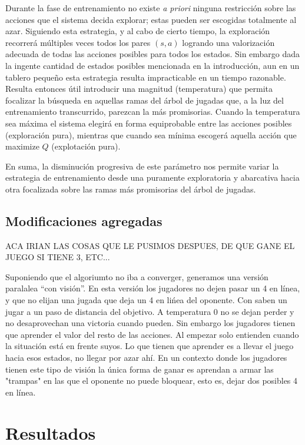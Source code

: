 \documentclass[11pt, spanish]{article}
\begin{document}
\par Durante la fase de entrenamiento no existe \emph{a priori} ninguna 
restricción sobre las acciones que el sistema decida explorar; estas pueden ser 
escogidas totalmente al azar. Siguiendo esta estrategia, y al cabo de 
cierto tiempo, la exploración recorrerá múltiples veces todos los pares 
$(s,a)$ logrando una valorización adecuada de todas las acciones posibles para 
todos los estados. Sin embargo dada la ingente cantidad de estados posibles 
mencionada en la introducción, aun en un tablero pequeño esta estrategia 
resulta impracticable en un tiempo razonable. Resulta entonces útil introducir 
una magnitud (temperatura) que permita focalizar la búsqueda en aquellas ramas 
del árbol de jugadas que, a la luz del entrenamiento transcurrido, parezcan la 
más promisorias. Cuando la temperatura sea máxima el sistema elegirá en forma 
equiprobable entre las acciones posibles (exploración pura), mientras que 
cuando sea mínima escogerá aquella acción que maximize $Q$ (explotación pura).
\par En suma, la disminución progresiva de este parámetro nos permite variar la 
estrategia de entrenamiento desde una puramente exploratoria y abarcativa hacia 
otra focalizada sobre las ramas más promisorias del árbol de jugadas.

\subsection{Modificaciones agregadas}
ACA IRIAN LAS COSAS QUE LE PUSIMOS DESPUES, DE QUE GANE EL JUEGO SI TIENE 3, ETC...

Suponiendo que el algoriumto no iba a converger, generamos una versi\'on paralalea ``con visi\'on''. En esta versi\'on los jugadores no dejen pasar un 4 en l\'inea, y que no elijan una jugada que deja un 4 en li\'nea del oponente. Con saben un jugar a un paso de distancia del objetivo. A temperatura 0 no se dejan perder y no desaprovechan una victoria cuando pueden. Sin embargo los jugadores tienen que aprender el valor del resto de las acciones. Al empezar solo entienden cuando la situación está en frente suyos. Lo que tienen que aprender es a llevar el juego hacia esos estados, no llegar por azar ahí. En un contexto donde los jugadores tienen este tipo de visi\'on la \'unica forma de ganar es aprendan a armar las "trampas" en las que el oponente no puede bloquear, esto es, dejar dos posibles 4 en línea.


\section{Resultados}
\end{document}
